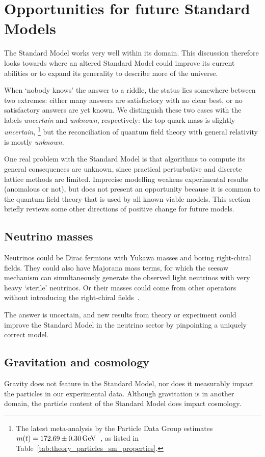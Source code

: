 \section{Opportunities for future Standard Models}
The Standard Model works very well within its domain.
This discussion therefore looks towards where an altered Standard Model could
improve its current abilities or to expand its generality to describe more of
the universe.

When `nobody knows' the answer to a riddle, the status lies somewhere between
two extremes:
either many answers are satisfactory with no clear best,
or no satisfactory answers are yet known.
We distinguish these two cases with the labels
\emph{uncertain} and \emph{unknown}, respectively:
the top quark mass is slightly \emph{uncertain},%
\footnote{%
The latest meta-analysis by the Particle Data Group estimates
$m(t) = 172.69 \pm 0.30\,\eV[G]$~\cite{pdg2022ynf}, as listed in
Table~\ref{tab:theory_particles_sm_properties}.
}
but the reconciliation of quantum field theory with general relativity is
mostly \emph{unknown}.

One real problem with the Standard Model is that algorithms to compute its
general consequences are unknown, since practical perturbative and discrete
lattice methods are limited.
Imprecise modelling weakens experimental results (anomalous or not),
but does not present an opportunity because it is common to the quantum field
theory that is used by all known viable models.
This section briefly reviews some other directions of positive change for
future models.


\subsection{Neutrino masses}
Neutrinos could be Dirac fermions with Yukawa masses and boring right-chiral
fields.
They could also have Majorana mass terms, for which the seesaw mechanism can
simultaneously generate the observed light neutrinos with very heavy `sterile'
neutrinos.
Or their masses could come from other operators without  introducing the
right-chiral fields~\cite{
thomson2013modern,
chala2021neutrino,
wells2020discovery
}.

The answer is uncertain, and new results from theory or experiment could
improve the Standard Model in the neutrino sector
by pinpointing a uniquely correct model.


\subsection{Gravitation and cosmology}
Gravity does not feature in the Standard Model, nor does it measurably impact
the particles in our experimental data.
Although gravitation is in another domain, the particle content of the
Standard Model does impact cosmology.

